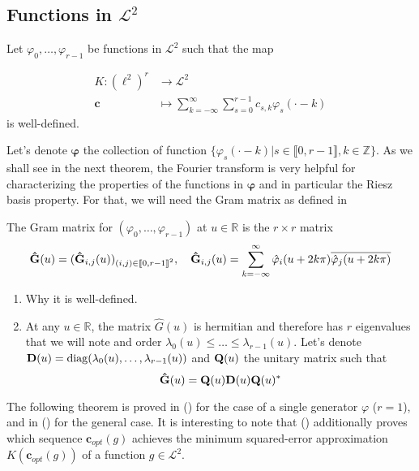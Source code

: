 \subsection{Functions in \texorpdfstring{$\mathcal{L}^2$}{g}}\label{ssec:l2}

Let $\varphi_0, \ldots, \varphi_{r-1}$ be functions in $\mathcal{L}^2$ such that the map 

\begin{align}\label{def:mapK}
  K: {(\ell^2)}^r &\longrightarrow  \mathcal{L}^2 \nonumber \\
  \bm{c} &\longmapsto \sum_{k=-\infty}^{\infty} \sum_{s=0}^{r-1} c_{s,k} \varphi_s(\cdot-k)
\end{align} is well-defined.  
  
Let's denote $\bm{\varphi}$ the collection of function ${\{\varphi_s(\cdot-k)| s \in \llbracket0, r-1\rrbracket, k \in 
\mathbb{Z}\}}$. As we shall see in the next theorem, the Fourier transform is very helpful for characterizing the 
properties of the functions in $\bm{\varphi}$ and in particular the Riesz basis property. For that, we will need the 
Gram matrix as defined in
\begin{deftn}
  The Gram matrix for $(\varphi_0, \ldots, \varphi_{r-1})$ at $u \in \mathbb{R}$ is the $r \times r$ matrix
  \begin{equation}
    \mathbf{\hat{G}}(u) = (\mathbf{\hat{G}}_{i,j}(u))_{(i,j) \in {\llbracket0, r-1\rrbracket}^2}, \quad 
    \mathbf{\hat{G}}_{i,j}(u) = \sum_{k=-\infty}^{\infty} \hat{\varphi}_i(u+2k\pi)\overline{\hat{\varphi}_j(u+2k\pi)}
  \end{equation}
\end{deftn}

\begin{remark}
  \begin{enumerate}
    \item Why it is well-defined.
    \item At any $u \in \mathbb{R}$, the matrix $\hat{G}(u)$ is hermitian and therefore has $r$ eigenvalues that we will 
      note and order $\lambda_0(u) \leq \ldots \leq \lambda_{r-1}(u)$. Let's denote $\mathbf{D}(u) = \operatorname*{diag} (\lambda_0(u), 
      \ldots, \lambda_{r-1}(u))$ and $\mathbf{Q}(u)$ the unitary matrix such that
      \begin{equation}\label{eq:spectral}
	\mathbf{\hat{G}}(u) = \mathbf{Q}(u) \mathbf{D}(u) \mathbf{Q}(u)^*
      \end{equation}
  \end{enumerate}
\end{remark} The following theorem is proved in (\cite[Theorem 2]{AldUns94}) for the case of a single generator 
$\varphi$ ($r=1$), and in (\cite[Theorem 3.1]{GST93}) for the general case. It is interesting to note that  
(\cite[Theorem 2]{AldUns94}) additionally proves which sequence $\bm{c}_{opt}(g)$ achieves the minimum squared-error 
approximation $K(\bm{c}_{opt}(g))$ of a function $g \in \mathcal{L}^2$.


